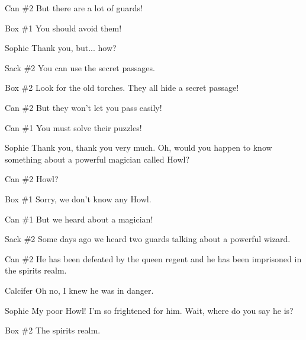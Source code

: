 \begin{screenplay}
\begin{dialogue}{Can \#{}2}
But there are a lot of guards!
\end{dialogue}
\begin{dialogue}{Box \#{}1}
You should avoid them!
\end{dialogue}
\begin{dialogue}{Sophie}
Thank you, but... how?
\end{dialogue}
\begin{dialogue}{Sack \#{}2}
You can use the secret passages.
\end{dialogue}
\begin{dialogue}{Box \#{}2}
Look for the old torches. They all hide a secret passage!
\end{dialogue}
\begin{dialogue}{Can \#{}2}
But they won't let you pass easily!
\end{dialogue}
\begin{dialogue}{Can \#{}1}
You must solve their puzzles!
\end{dialogue}
\begin{dialogue}[grateful]{Sophie}
Thank you, thank you very much. Oh, would you happen to know something about a powerful magician called Howl?
\end{dialogue}
\begin{dialogue}{Can \#{}2}
Howl?
\end{dialogue}
\begin{dialogue}{Box \#{}1}
Sorry, we don’t know any Howl.
\end{dialogue}
\begin{dialogue}{Can \#{}1}
But we heard about a magician!
\end{dialogue}
\begin{dialogue}{Sack \#{}2}
Some days ago we heard two guards talking about a powerful wizard.
\end{dialogue}
\begin{dialogue}{Can \#{}2}
He has been defeated by the queen regent and he has been imprisoned in the spirits realm.
\end{dialogue}
\begin{dialogue}{Calcifer}
Oh no, I knew he was in danger.
\end{dialogue}
\begin{dialogue}{Sophie}
My poor Howl! I’m so frightened for him. Wait, where do you say he is?
\end{dialogue}
\begin{dialogue}{Box \#{}2}
The spirits realm.

\end{dialogue}
\end{screenplay}
